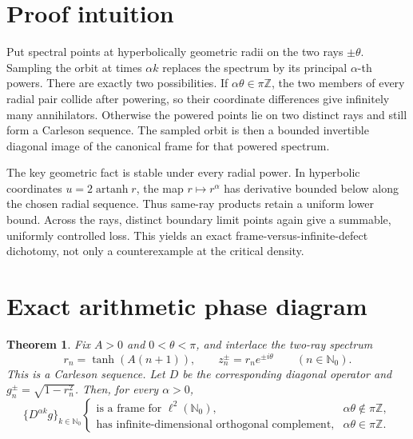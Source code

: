 \documentclass[11pt]{article}
\newtheorem{theorem}{Theorem}
\theoremstyle{definition}
\newcommand{\N}{\mathbb N}
\begin{document}
\section{Proof intuition}

Put spectral points at hyperbolically geometric radii on the two rays
\(\pm\theta\).  Sampling the orbit at times \(\alpha k\) replaces the
spectrum by its principal \(\alpha\)-th powers.  There are exactly two
possibilities.  If \(\alpha\theta\in\pi\mathbb Z\), the two members of
every radial pair collide after powering, so their coordinate differences
give infinitely many annihilators.  Otherwise the powered points lie on two
distinct rays and still form a Carleson sequence.  The sampled orbit is then
a bounded invertible diagonal image of the canonical frame for that powered
spectrum.

The key geometric fact is stable under every radial power.  In hyperbolic
coordinates \(u=2\operatorname{artanh}r\), the map
\(r\mapsto r^\alpha\) has derivative bounded below along the chosen radial
sequence.  Thus same-ray products retain a uniform lower bound.  Across the
rays, distinct boundary limit points again give a summable, uniformly
controlled loss.  This yields an exact frame-versus-infinite-defect
dichotomy, not only a counterexample at the critical density.

\section{Exact arithmetic phase diagram}

\begin{theorem}\label{thm:phase}
Fix \(A>0\) and \(0<\theta<\pi\), and interlace the two-ray spectrum
\[
 r_n=\tanh(A(n+1)),\qquad
 z_n^\pm=r_ne^{\pm i\theta}
 \qquad(n\in\N_0).
\]
This is a Carleson sequence.  Let \(D\) be the corresponding diagonal
operator and \(g_n^\pm=\sqrt{1-r_n^2}\).  Then, for every \(\alpha>0\),
\[
 \{D^{\alpha k}g\}_{k\in\N_0}
 \begin{cases}
 \text{is a frame for \(\ell^2(\N_0)\),}
     &\alpha\theta\notin\pi\mathbb Z,\\[2mm]
 \text{has infinite-dimensional orthogonal complement,}
     &\alpha\theta\in\pi\mathbb Z.
 \end{cases}
\]
\end{theorem}
\end{document}
